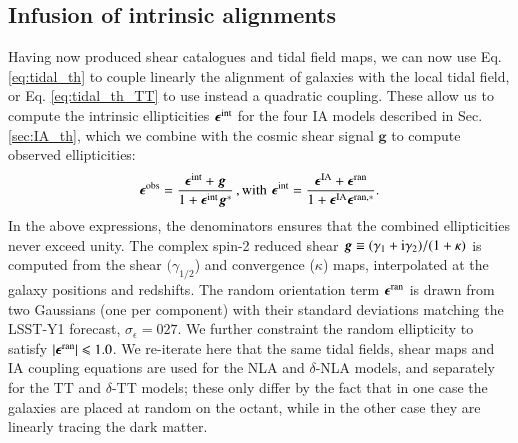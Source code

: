 \documentclass[useAMS,usenatbib]{mn2e}
\begin{document}
\subsection{Infusion of intrinsic alignments}
\label{subsec:IA_infusion}

Having now produced shear catalogues and tidal field maps, we can now use Eq. \ref{eq:tidal_th} to couple linearly the alignment of galaxies with the local tidal field, or Eq. \ref{eq:tidal_th_TT} to use instead a quadratic coupling. These allow us to compute the intrinsic ellipticities ${\boldsymbol \epsilon}^{\rm int}$ for the four IA models described in Sec. \ref{sec:IA_th}, which we combine with the cosmic shear signal ${\boldsymbol g}$ to compute observed ellipticities: 
\begin{eqnarray}
{\boldsymbol \epsilon}^{\rm obs} = \frac{{\boldsymbol \epsilon}^{\rm int} + {\boldsymbol g}}{1 + {\boldsymbol \epsilon}^{\rm int}{\boldsymbol g^*}} \,, {\rm with \, \, } 
{\boldsymbol \epsilon}^{\rm int}  = \frac{{\boldsymbol \epsilon}^{\rm IA} + {\boldsymbol \epsilon}^{\rm ran}}{1 + {\boldsymbol \epsilon}^{\rm IA}{\boldsymbol \epsilon^{\rm ran, *}}}.
\label{eq:eps_obs}
\end{eqnarray}
In the above expressions, the denominators ensures that the combined  ellipticities never exceed unity.
The complex spin-2 reduced shear ${\boldsymbol g} \equiv (\gamma_1 + {\rm i} \gamma_2)/(1+\kappa)$ is computed from the shear  $(\gamma_{1/2}$) and convergence ($\kappa$) maps, interpolated at the galaxy positions and redshifts. The  random orientation term ${\boldsymbol \epsilon}^{\rm ran}$ is drawn from two Gaussians (one per component) with their standard deviations matching the LSST-Y1 forecast, $\sigma_{\epsilon} = 027$. We further constraint  the random ellipticity to satisfy $|{\boldsymbol \epsilon}^{\rm ran}| \le 1.0$. 
We re-iterate here that the same tidal fields, shear maps and IA coupling equations are used for the NLA and $\delta$-NLA models, and separately for the TT and $\delta$-TT models; these  only differ by the fact that in one case the galaxies are placed at random on the octant, while in the other case they are linearly tracing the dark matter.
\end{document}
